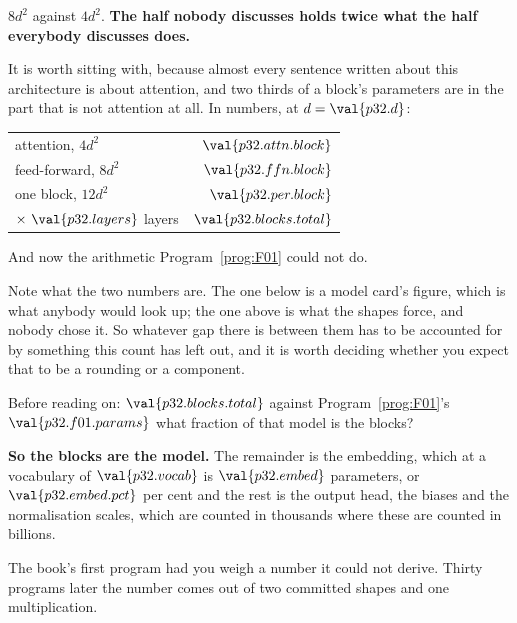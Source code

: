 \begin{fr}

$8d^{2}$ against $4d^{2}$. \textbf{The half nobody discusses holds twice
what the half everybody discusses does.}

It is worth sitting with, because almost every sentence written about this
architecture is about attention, and two thirds of a block's parameters are
in the part that is not attention at all. In numbers, at
$d = \val{p32.d}$:

\begin{center}
\begin{tabular}{lr}
\toprule
attention, $4d^{2}$ & $\val{p32.attn.block}$ \\
feed-forward, $8d^{2}$ & $\val{p32.ffn.block}$ \\
\midrule
one block, $12d^{2}$ & $\val{p32.per.block}$ \\
$\times\ \val{p32.layers}$ layers & $\val{p32.blocks.total}$ \\
\bottomrule
\end{tabular}
\end{center}

And now the arithmetic Program~\ref{prog:F01} could not do.

Note what the two numbers are. The one below is a model card's figure, which
is what anybody would look up; the one above is what the shapes force, and
nobody chose it. So whatever gap there is between them has to be accounted for
by something this count has left out, and it is worth deciding whether you
expect that to be a rounding or a component.

Before reading on: $\val{p32.blocks.total}$ against
Program~\ref{prog:F01}'s $\val{p32.f01.params}$ \dash{} what fraction of
that model is the blocks?
\dotline
\nextframe
\end{fr}

\begin{fr}

\textbf{So the blocks are the model.} The remainder is the embedding, which
at a vocabulary of $\val{p32.vocab}$ is $\val{p32.embed}$ parameters, or
$\val{p32.embed.pct}$ per cent \dash{} and the rest is the output head, the
biases and the normalisation scales, which are counted in thousands where
these are counted in billions.

The book's first program had you weigh a number it could not derive. Thirty
programs later the number comes out of two committed shapes and one
multiplication.
\end{fr}

